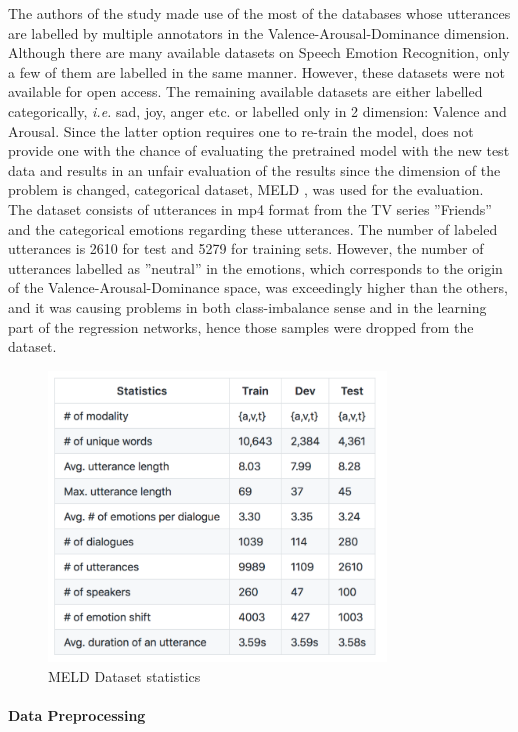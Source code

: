 \documentclass[a4paper,11pt]{article}
\begin{document}
The authors of the study made use of the most of the databases whose utterances are labelled by multiple annotators in the Valence-Arousal-Dominance dimension. 
Although there are many available datasets on Speech Emotion Recognition, only a few of them are labelled in the same manner. However, these datasets were not available for open access. The remaining available datasets are either labelled categorically, \textit{i.e.} sad, joy, anger etc. or labelled only in 2 dimension: Valence and Arousal. Since the latter option requires one to re-train the model, does not provide one with the chance of evaluating the pretrained model with the new test data and results in an unfair evaluation of the results since the dimension of the problem is changed, categorical dataset, MELD \cite{atmaja2020deep}, was used for the evaluation. The dataset consists of utterances in mp4 format from the TV series ''Friends'' and the categorical emotions regarding these utterances. The number of labeled utterances is 2610 for test and 5279 for training sets. However, the number of utterances labelled as ''neutral'' in the emotions, which corresponds to the origin of the Valence-Arousal-Dominance space, was exceedingly higher than the others, and it was causing problems in both class-imbalance sense and in the learning part of the regression networks, hence those samples were dropped from the dataset.

\begin{figure}[h]
\centering
\includegraphics[width=0.8\textwidth]{MELDStats.png}
\caption{MELD Dataset statistics}\label{fig:meldstats}
\end{figure}

\paragraph{Data Preprocessing}
\end{document}
